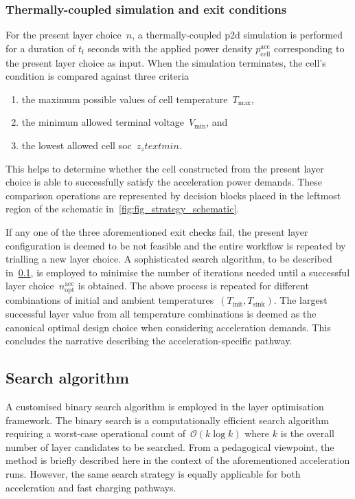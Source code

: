 \subsubsection*{Thermally-coupled  simulation and exit
conditions}\label{sec:accexitconditions}

For the  present layer choice~$n$,  a thermally-coupled \gls{p2d}  simulation is
performed for a duration of $t_\text{f}$  seconds with the applied power density
$p^\text{acc}_\text{cell}$ corresponding to the present layer choice as input.
When the simulation terminates, the cell's condition is compared against three
criteria
\begin{enumerate}
    \item the maximum possible values of cell temperature~$T_\text{max}$,
    \item the minimum allowed terminal voltage~$V_\text{min}$, and
    \item the lowest allowed cell \gls{soc}~$z_ztext{min}$.
\end{enumerate}
This helps to determine whether the cell constructed from the present layer
choice is able to successfully satisfy the acceleration power demands. These
comparison operations are represented by decision blocks placed in the leftmost
region of the schematic in~\cref{fig:fig_strategy_schematic}.

If  any one  of the  three aforementioned  exit checks  fail, the  present layer
configuration is deemed  to be not feasible and the  entire workflow is repeated
by  trialling a  new  layer  choice. A  sophisticated  search  algorithm, to  be
described  in~\cref{sec:searchalgo},  is  employed  to minimise  the  number  of
iterations needed  until a successful layer  choice~$n_\text{opt}^\text{acc}$ is
obtained. The  above process is  repeated for different combinations  of initial
and  ambient temperatures~\mbox{$(T_\text{init},  T_\text{sink})$}. The  largest
successful  layer value  from  all  temperature combinations  is  deemed as  the
canonical  optimal design  choice  when considering  acceleration demands.  This
concludes the narrative describing the acceleration-specific pathway.

\subsection{Search algorithm}\label{sec:searchalgo}

A  customised binary  search algorithm  is  employed in  the layer  optimisation
framework. The  binary search  is a  computationally efficient  search algorithm
requiring a worst-case operational count of~$\mathcal{O}(k \log k)$ where $k$ is
the  overall number  of  layer candidates  to be  searched.  From a  pedagogical
viewpoint,  the  method  is  briefly  described  here  in  the  context  of  the
aforementioned acceleration runs.  However, the same search  strategy is equally
applicable for both acceleration and fast charging pathways.

